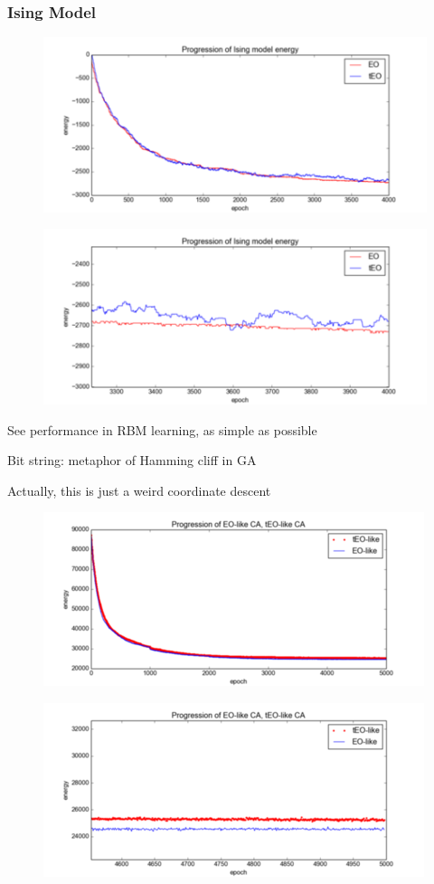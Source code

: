 \documentclass[12pt]{article}
\begin{document}
  \frametitle{Ising Model}
  \begin{figure}
    \includegraphics{ising_energy_unzoomed}
  \end{figure}
  
  \begin{figure}
    \includegraphics{ising_energy_zoomed}
  \end{figure}

  See performance in RBM learning, as simple as possible

  Bit string: metaphor of Hamming cliff in GA

  Actually, this is just a weird coordinate descent
  
  \begin{figure}
    \includegraphics{eo_rbm_unzoomed}
  \end{figure}
 
  \begin{figure}
    \includegraphics{eo_rbm_zoomed}
  \end{figure}
\end{document}
